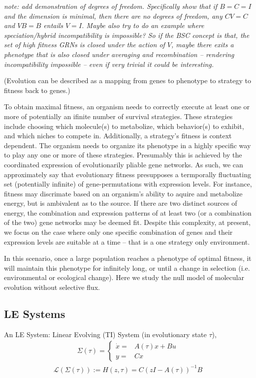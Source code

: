\documentclass[11 pt]{article}
\newcommand{\jss}[1]{{\color{olive}\it #1}}
\newcommand{\1}{\mathbbm{1}}
\begin{document}
      \jss{note: add demonstration of degrees of freedom. Specifically show that if $B=C=I$ and the dimension is minimal, then there are no degrees of freedom, any $CV=C$ and $VB=B$ entails $V=I$.
      Maybe also try to do an example where speciation/hybrid incompatibility is impossible? So if the BSC concept is that, the set of high fitness GRNs is closed under the action of $V$, maybe there exits a phenotype that is also closed under averaging and recombination -- rendering incompatibility impossible -- even if very trivial it could be interesting.}

(Evolution can be described as a mapping from genes to phenotype to strategy to fitness back to genes.)

To obtain maximal fitness, an organism needs to correctly execute at least one or more of potentially an ifinite number of survival strategies. These strategies include choosing which molecule(s) to metabolize, which behavior(s) to exhibit, and which niches to compete in. Additionally, a strategy's fitness is context dependent. The organism needs to organize its phenotype in a highly specific way to play any one or more of these strategies. Presumably this is achieved by the coordinated expression of evolutionarily pliable gene networks. 
As such, we can approximately say that evolutionary fitness presupposes a termporally fluctuating set (potentially infinite) of gene-permutations with expression levels. For instance, fitness may discrimate based on an organism's ability to aquire and metabolize energy, but is ambivalent as to the source. If there are two distinct sources of energy, the combination and expression patterns of at least two (or a combination of the two) gene networks may be deemed fit. Despite this complexity, at present, we focus on the case where only one specific combination of genes and their expression levels are suitable at a time -- that is a one strategy only environment.


In this scenario, once a large population reaches a phenotype of optimal fitness, it will maintain this phenotype for infinitely long, or until a change in selection (i.e. environmental or ecological change). Here we study the null model of molecular evolution without selective flux.

    \subsection{LE Systems}
    An LE System: Linear Evolving (TI) System (in evolutionary state $\tau$), 
    \begin{align*}
      \Sigma(\tau) = \left\{ \begin{array}{cc} \dot{x} =& A(\tau)x + Bu \\
      y =& Cx \end{array} \right.
    \end{align*}
    \begin{align*}
      \mathcal{L}(\Sigma(\tau)) := H(z, \tau) = C \left(zI - A(\tau) \right)^{-1} B
    \end{align*}
\end{document}

